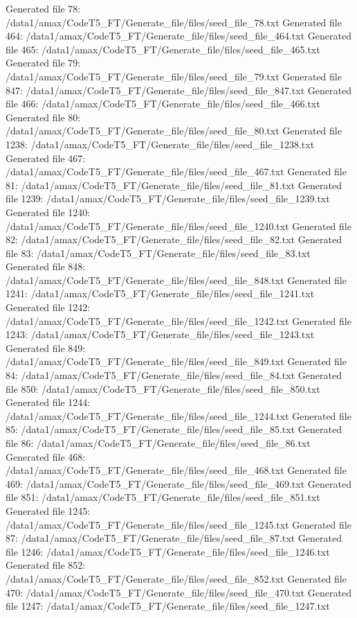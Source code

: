 Generated file 78: /data1/amax/CodeT5_FT/Generate_file/files/seed_file_78.txt
Generated file 464: /data1/amax/CodeT5_FT/Generate_file/files/seed_file_464.txt
Generated file 465: /data1/amax/CodeT5_FT/Generate_file/files/seed_file_465.txt
Generated file 79: /data1/amax/CodeT5_FT/Generate_file/files/seed_file_79.txt
Generated file 847: /data1/amax/CodeT5_FT/Generate_file/files/seed_file_847.txt
Generated file 466: /data1/amax/CodeT5_FT/Generate_file/files/seed_file_466.txt
Generated file 80: /data1/amax/CodeT5_FT/Generate_file/files/seed_file_80.txt
Generated file 1238: /data1/amax/CodeT5_FT/Generate_file/files/seed_file_1238.txt
Generated file 467: /data1/amax/CodeT5_FT/Generate_file/files/seed_file_467.txt
Generated file 81: /data1/amax/CodeT5_FT/Generate_file/files/seed_file_81.txt
Generated file 1239: /data1/amax/CodeT5_FT/Generate_file/files/seed_file_1239.txt
Generated file 1240: /data1/amax/CodeT5_FT/Generate_file/files/seed_file_1240.txt
Generated file 82: /data1/amax/CodeT5_FT/Generate_file/files/seed_file_82.txt
Generated file 83: /data1/amax/CodeT5_FT/Generate_file/files/seed_file_83.txt
Generated file 848: /data1/amax/CodeT5_FT/Generate_file/files/seed_file_848.txt
Generated file 1241: /data1/amax/CodeT5_FT/Generate_file/files/seed_file_1241.txt
Generated file 1242: /data1/amax/CodeT5_FT/Generate_file/files/seed_file_1242.txt
Generated file 1243: /data1/amax/CodeT5_FT/Generate_file/files/seed_file_1243.txt
Generated file 849: /data1/amax/CodeT5_FT/Generate_file/files/seed_file_849.txt
Generated file 84: /data1/amax/CodeT5_FT/Generate_file/files/seed_file_84.txt
Generated file 850: /data1/amax/CodeT5_FT/Generate_file/files/seed_file_850.txt
Generated file 1244: /data1/amax/CodeT5_FT/Generate_file/files/seed_file_1244.txt
Generated file 85: /data1/amax/CodeT5_FT/Generate_file/files/seed_file_85.txt
Generated file 86: /data1/amax/CodeT5_FT/Generate_file/files/seed_file_86.txt
Generated file 468: /data1/amax/CodeT5_FT/Generate_file/files/seed_file_468.txt
Generated file 469: /data1/amax/CodeT5_FT/Generate_file/files/seed_file_469.txt
Generated file 851: /data1/amax/CodeT5_FT/Generate_file/files/seed_file_851.txt
Generated file 1245: /data1/amax/CodeT5_FT/Generate_file/files/seed_file_1245.txt
Generated file 87: /data1/amax/CodeT5_FT/Generate_file/files/seed_file_87.txt
Generated file 1246: /data1/amax/CodeT5_FT/Generate_file/files/seed_file_1246.txt
Generated file 852: /data1/amax/CodeT5_FT/Generate_file/files/seed_file_852.txt
Generated file 470: /data1/amax/CodeT5_FT/Generate_file/files/seed_file_470.txt
Generated file 1247: /data1/amax/CodeT5_FT/Generate_file/files/seed_file_1247.txt
